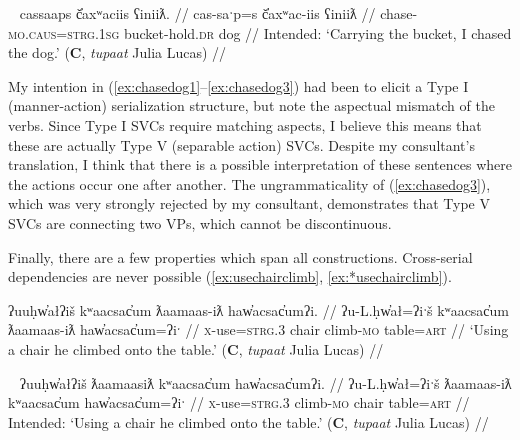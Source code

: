 \ex~ \label{ex:chasedog3}
\begingl
\glpreamble *cassaaps č̓axʷaciis ʕiniiƛ. //
\gla cas-saˑp=s č̓axʷac-iis ʕiniiƛ //
\glb chase-\textsc{mo.caus}=\textsc{strg.1sg} bucket-hold.\textsc{dr} dog //
\glft Intended: `Carrying the bucket, I chased the dog.' (\textbf{C}, \textit{tupaat} Julia Lucas) //
\endgl
\xe

My intention in (\ref{ex:chasedog1}--\ref{ex:chasedog3}) had been to elicit a Type I (manner-action) serialization structure, but note the aspectual mismatch of the verbs. Since Type I SVCs require matching aspects, I believe this means that these are actually Type V (separable action) SVCs. Despite my consultant's translation, I think that there is a possible interpretation of these sentences where the actions occur one after another. The ungrammaticality of (\ref{ex:chasedog3}), which was very strongly rejected by my consultant, demonstrates that Type V SVCs are connecting two VPs, which cannot be discontinuous.

Finally, there are a few properties which span all constructions. Cross-serial dependencies are never possible (\ref{ex:usechairclimb}, \ref{ex:*usechairclimb}).

\ex \label{ex:usechairclimb}
\begingl
\glpreamble ʔuuḥw̓ałʔiš kʷaacsac̓um ƛaamaas-iƛ haw̓acsac̓umʔi. //
\gla ʔu-L.ḥw̓ał=ʔiˑš kʷaacsac̓um ƛaamaas-iƛ haw̓acsac̓um=ʔiˑ //
\glb \textsc{x}-use=\textsc{strg.3} chair climb-\textsc{mo} table=\textsc{art} //
\glft `Using a chair he climbed onto the table.' (\textbf{C}, \textit{tupaat} Julia Lucas) //
\endgl
\xe

\ex~ \label{ex:*usechairclimb}
\begingl
\glpreamble *ʔuuḥw̓ałʔiš ƛaamaasiƛ kʷaacsac̓um haw̓acsac̓umʔi. //
\gla ʔu-L.ḥw̓ał=ʔiˑš ƛaamaas-iƛ kʷaacsac̓um haw̓acsac̓um=ʔiˑ //
\glb \textsc{x}-use=\textsc{strg.3} climb-\textsc{mo} chair table=\textsc{art} //
\glft Intended: `Using a chair he climbed onto the table.' (\textbf{C}, \textit{tupaat} Julia Lucas) //
\endgl
\xe






